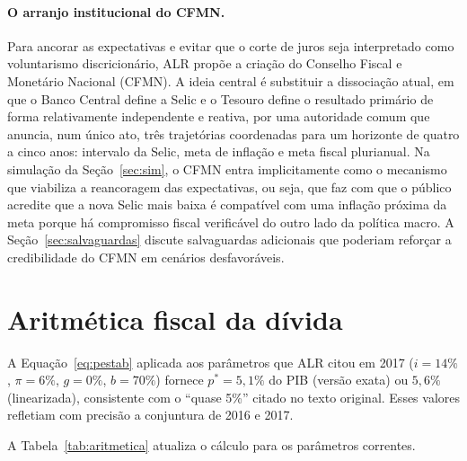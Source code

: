 \documentclass[11pt,a4paper]{article}
\begin{document}
\paragraph{O arranjo institucional do CFMN.} Para ancorar as expectativas
e evitar que o corte de juros seja interpretado como voluntarismo
discricionário, ALR propõe a criação do Conselho Fiscal e Monetário
Nacional (CFMN). A ideia central é substituir a dissociação atual, em
que o Banco Central define a Selic e o Tesouro define o resultado
primário de forma relativamente independente e reativa, por uma
autoridade comum que anuncia, num único ato, três trajetórias
coordenadas para um horizonte de quatro a cinco anos: intervalo da
Selic, meta de inflação e meta fiscal plurianual. Na simulação da
Seção~\ref{sec:sim}, o CFMN entra implicitamente como o mecanismo que
viabiliza a reancoragem das expectativas, ou seja, que faz com que o
público acredite que a nova Selic mais baixa é compatível com uma
inflação próxima da meta porque há compromisso fiscal verificável do
outro lado da política macro. A Seção~\ref{sec:salvaguardas} discute
salvaguardas adicionais que poderiam reforçar a credibilidade do CFMN
em cenários desfavoráveis.

\section{Aritmética fiscal da dívida}\label{sec:aritmetica}

A Equação~\ref{eq:pestab} aplicada aos parâmetros que ALR citou em 2017
($i=14\%$, $\pi=6\%$, $g=0\%$, $b=70\%$) fornece $p^* = 5{,}1\%$ do PIB
(versão exata) ou $5{,}6\%$ (linearizada), consistente com o ``quase 5\%''
citado no texto original. Esses valores refletiam com precisão a
conjuntura de 2016 e 2017.

A Tabela~\ref{tab:aritmetica} atualiza o cálculo para os parâmetros
correntes.
\end{document}
